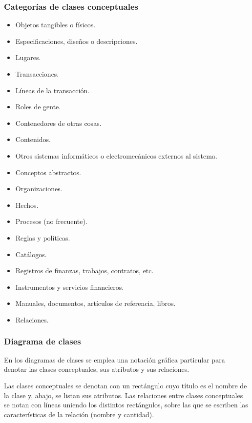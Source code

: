\documentclass[]{article}
\begin{document}
\subsubsection{Categorías de clases conceptuales}
\begin{multicols}{2}
	\begin{itemize}
		\item Objetos tangibles o físicos.
		\item Especificaciones, diseños o descripciones.
		\item Lugares.
		\item Transacciones.
		\item Líneas de la transacción.
		\item Roles de gente.
		\item Contenedores de otras cosas.
		\item Contenidos.
		\item Otros sistemas informáticos o electromecánicos externos al sistema.
		\item Conceptos abstractos.
		\item Organizaciones.
		\item Hechos.
		\item Procesos (no frecuente).
		\item Reglas y políticas.
		\item Catálogos.
		\item Registros de finanzas, trabajos, contratos, etc.
		\item Instrumentos y servicios financieros.
		\item Manuales, documentos, artículos de referencia, libros.
		\item Relaciones.
	\end{itemize}
\end{multicols}

\subsubsection{Diagrama de clases}
En los diagramas de clases se emplea una notación gráfica particular para denotar las clases conceptuales, sus atributos y sus relaciones.

Las clases conceptuales se denotan con un rectángulo cuyo título es el nombre de la clase y, abajo, se listan sus atributos. Las relaciones entre clases conceptuales se notan con líneas uniendo los distintos rectángulos, sobre las que se escriben las características de la relación (nombre y cantidad).
\end{document}
